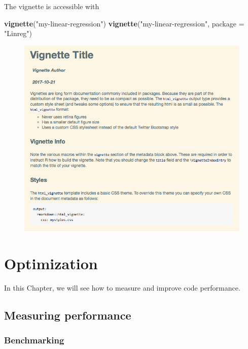 \documentclass[]{book}
\newenvironment{Shaded}{\begin{snugshade}}{\end{snugshade}}
\newcommand{\KeywordTok}[1]{\textcolor[rgb]{0.13,0.29,0.53}{\textbf{#1}}}
\newcommand{\DataTypeTok}[1]{\textcolor[rgb]{0.13,0.29,0.53}{#1}}
\newcommand{\StringTok}[1]{\textcolor[rgb]{0.31,0.60,0.02}{#1}}
\newcommand{\NormalTok}[1]{#1}
\theoremstyle{definition}
\theoremstyle{definition}
\theoremstyle{definition}
\theoremstyle{remark}
\begin{document}
The vignette is accessible with

\begin{Shaded}
\begin{Highlighting}[]
\KeywordTok{vignette}\NormalTok{(}\StringTok{"my-linear-regression"}\NormalTok{)}
\KeywordTok{vignette}\NormalTok{(}\StringTok{"my-linear-regression"}\NormalTok{, }\DataTypeTok{package =} \StringTok{"Linreg"}\NormalTok{)}
\end{Highlighting}
\end{Shaded}

\begin{figure}

{\centering \includegraphics{images/ch3_vignette_html} 

}

\end{figure}

\chapter{Optimization}\label{optimization}

In this Chapter, we will see how to measure and improve code
performance.

\section{Measuring performance}\label{measuring-performance}

\subsection{Benchmarking}\label{benchmarking}
\end{document}
